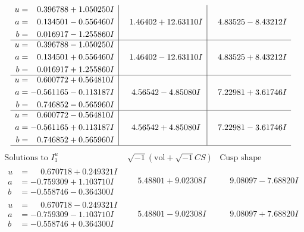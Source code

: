 \documentclass[1p]{elsarticle_modified}
\theoremstyle{definition}
\newcommand{\I}{\sqrt{-1}}
\begin{document}
$$\begin{array}{c|c|c}
\begin{aligned}
u &= \phantom{-}0.396788 + 1.050250 I \\
a &= \phantom{-}0.134501 - 0.556460 I \\
b &= \phantom{-}0.016917 - 1.255860 I\end{aligned}
 & \phantom{-}1.46402 + 12.63110 I & \phantom{-}4.83525 - 8.43212 I \\ \hline\begin{aligned}
u &= \phantom{-}0.396788 - 1.050250 I \\
a &= \phantom{-}0.134501 + 0.556460 I \\
b &= \phantom{-}0.016917 + 1.255860 I\end{aligned}
 & \phantom{-}1.46402 - 12.63110 I & \phantom{-}4.83525 + 8.43212 I \\ \hline\begin{aligned}
u &= \phantom{-}0.600772 + 0.564810 I \\
a &= -0.561165 - 0.113187 I \\
b &= \phantom{-}0.746852 - 0.565960 I\end{aligned}
 & \phantom{-}4.56542 - 4.85080 I & \phantom{-}7.22981 + 3.61746 I \\ \hline\begin{aligned}
u &= \phantom{-}0.600772 - 0.564810 I \\
a &= -0.561165 + 0.113187 I \\
b &= \phantom{-}0.746852 + 0.565960 I\end{aligned}
 & \phantom{-}4.56542 + 4.85080 I & \phantom{-}7.22981 - 3.61746 I\\
 \hline 
 \end{array}$$\newpage$$\begin{array}{c|c|c}  
\text{Solutions to }I^u_{1}& \I (\text{vol} + \sqrt{-1}CS) & \text{Cusp shape}\\
 \hline 
\begin{aligned}
u &= \phantom{-}0.670718 + 0.249321 I \\
a &= -0.759309 + 1.103710 I \\
b &= -0.558746 - 0.364300 I\end{aligned}
 & \phantom{-}5.48801 + 9.02308 I & \phantom{-}9.08097 - 7.68820 I \\ \hline\begin{aligned}
u &= \phantom{-}0.670718 - 0.249321 I \\
a &= -0.759309 - 1.103710 I \\
b &= -0.558746 + 0.364300 I\end{aligned}
 & \phantom{-}5.48801 - 9.02308 I & \phantom{-}9.08097 + 7.68820 I \\ \hline\begin{aligned}

\end{aligned}
\end{array}$$
\end{document}
